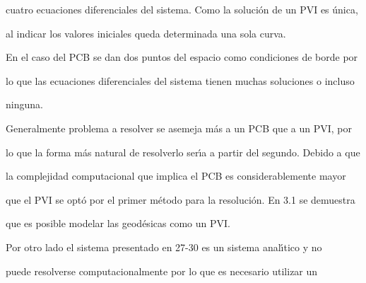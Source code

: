 \documentclass[a4paper,portrait,12pt]{article}
\begin{document}
\begin{flushleft}
cuatro ecuaciones diferenciales del sistema. Como la solución de un PVI es única,
\end{flushleft}


\begin{flushleft}
al indicar los valores iniciales queda determinada una sola curva.
\end{flushleft}


\begin{flushleft}
En el caso del PCB se dan dos puntos del espacio como condiciones de borde por
\end{flushleft}


\begin{flushleft}
lo que las ecuaciones diferenciales del sistema tienen muchas soluciones o incluso
\end{flushleft}


\begin{flushleft}
ninguna.
\end{flushleft}


\begin{flushleft}
Generalmente problema a resolver se asemeja más a un PCB que a un PVI, por
\end{flushleft}


\begin{flushleft}
lo que la forma más natural de resolverlo ser\i{}́a a partir del segundo. Debido a que
\end{flushleft}


\begin{flushleft}
la complejidad computacional que implica el PCB es considerablemente mayor
\end{flushleft}


\begin{flushleft}
que el PVI se optó por el primer método para la resolución. En 3.1 se demuestra
\end{flushleft}


\begin{flushleft}
que es posible modelar las geodésicas como un PVI.
\end{flushleft}


\begin{flushleft}
Por otro lado el sistema presentado en 27-30 es un sistema anal\i{}́tico y no
\end{flushleft}


\begin{flushleft}
puede resolverse computacionalmente por lo que es necesario utilizar un
\end{flushleft}
\end{document}
